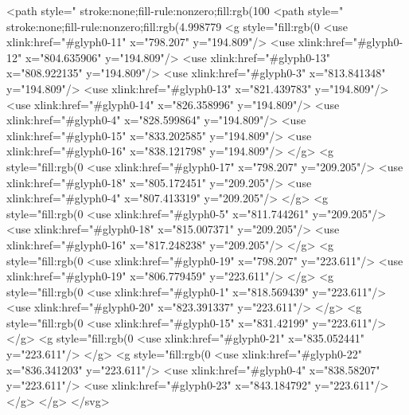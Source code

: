 <path style=" stroke:none;fill-rule:nonzero;fill:rgb(100%
<path style=" stroke:none;fill-rule:nonzero;fill:rgb(4.998779%
<g style="fill:rgb(0%
  <use xlink:href="#glyph0-11" x="798.207" y="194.809"/>
  <use xlink:href="#glyph0-12" x="804.635906" y="194.809"/>
  <use xlink:href="#glyph0-13" x="808.922135" y="194.809"/>
  <use xlink:href="#glyph0-3" x="813.841348" y="194.809"/>
  <use xlink:href="#glyph0-13" x="821.439783" y="194.809"/>
  <use xlink:href="#glyph0-14" x="826.358996" y="194.809"/>
  <use xlink:href="#glyph0-4" x="828.599864" y="194.809"/>
  <use xlink:href="#glyph0-15" x="833.202585" y="194.809"/>
  <use xlink:href="#glyph0-16" x="838.121798" y="194.809"/>
</g>
<g style="fill:rgb(0%
  <use xlink:href="#glyph0-17" x="798.207" y="209.205"/>
  <use xlink:href="#glyph0-18" x="805.172451" y="209.205"/>
  <use xlink:href="#glyph0-4" x="807.413319" y="209.205"/>
</g>
<g style="fill:rgb(0%
  <use xlink:href="#glyph0-5" x="811.744261" y="209.205"/>
  <use xlink:href="#glyph0-18" x="815.007371" y="209.205"/>
  <use xlink:href="#glyph0-16" x="817.248238" y="209.205"/>
</g>
<g style="fill:rgb(0%
  <use xlink:href="#glyph0-19" x="798.207" y="223.611"/>
  <use xlink:href="#glyph0-19" x="806.779459" y="223.611"/>
</g>
<g style="fill:rgb(0%
  <use xlink:href="#glyph0-1" x="818.569439" y="223.611"/>
  <use xlink:href="#glyph0-20" x="823.391337" y="223.611"/>
</g>
<g style="fill:rgb(0%
  <use xlink:href="#glyph0-15" x="831.42199" y="223.611"/>
</g>
<g style="fill:rgb(0%
  <use xlink:href="#glyph0-21" x="835.052441" y="223.611"/>
</g>
<g style="fill:rgb(0%
  <use xlink:href="#glyph0-22" x="836.341203" y="223.611"/>
  <use xlink:href="#glyph0-4" x="838.58207" y="223.611"/>
  <use xlink:href="#glyph0-23" x="843.184792" y="223.611"/>
</g>
</g>
</svg>
